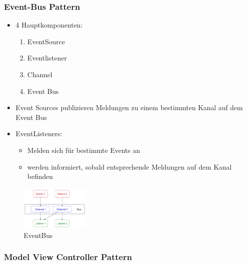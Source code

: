 \documentclass{article}
\begin{document}
\subsubsection{Event-Bus Pattern}
\begin{multicols}{2}
	\begin{itemize}
		\item 4 Hauptkomponenten:
		\begin{enumerate}
			\item EventSource
			\item Eventlistener
			\item Channel
			\item Event Bus
		\end{enumerate}
		\item \colorbox{blue!30}{Event Sources} publizieren Meldungen zu einem bestimmten \colorbox{blue!30}{Kanal} auf dem \colorbox{blue!30}{Event Bus}
		\item \colorbox{blue!30}{EventListeners:}
		\begin{itemize}
			\item Melden sich für bestimmte Events an
			\item werden informiert, sobald entsprechende Meldungen auf dem \colorbox{blue!30}{Kanal} befinden
		\end{itemize}
	\end{itemize}
\columnbreak

\begin{figure}[H]			\includegraphics[width=0.3\textwidth] {Resources/Images/EventBus.png}
\caption{\label{fig:EventBus}EventBus}
\end{figure}

\end{multicols}

\pagebreak

\subsubsection{Model View Controller Pattern}
\end{document}
